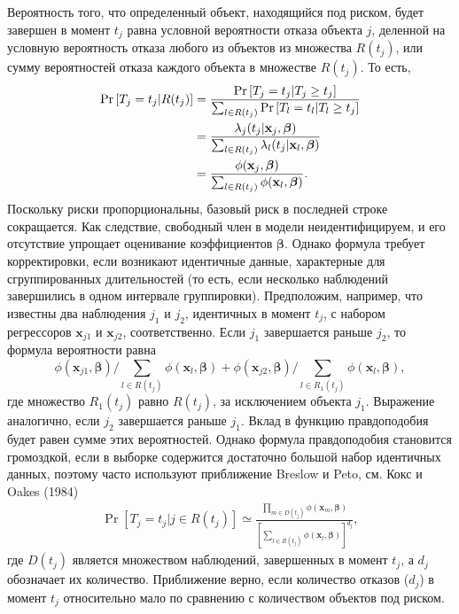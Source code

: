 Вероятность того, что определенный объект, находящийся под риском, будет завершен в момент $t_j$ равна условной вероятности отказа объекта $j$, деленной на условную вероятность отказа любого из объектов из множества $R(t_j)$, или сумму вероятностей отказа каждого объекта в множестве $R(t_j)$. То есть,
        \begin{align}
        \mathrm{Pr}\left[T_j=t_j|R(t_j)\right]&=\frac{\mathrm{Pr}\left[T_j=t_j|T_j\ge t_j\right]}{\sum_{l\in R(t_j)}\mathrm{Pr}\left[T_l=t_l|T_l\ge t_j\right]}\notag\\
        &=\frac{\lambda_j(t_j|\mathbf{x}_j,\bm{\beta})}{\sum_{l\in R(t_j)}\lambda_l(t_j|\mathbf{x}_l,\bm{\beta})}\notag\\
        &=\frac{\phi(\mathbf{x}_j,\bm{\beta})}{\sum_{l\in R(t_j)}\phi(\mathbf{x}_l,\bm{\beta})}. \notag
        \end{align}
Поскольку риски пропорциональны, базовый риск в последней строке сокращается. Как следствие, свободный член в модели неидентифицируем, и его отсутствие упрощает оценивание коэффициентов $\bm{\beta}$. Однако формула требует корректировки, если возникают идентичные данные, характерные для сгруппированных длительностей (то есть, если несколько наблюдений завершились в одном интервале группировки). Предположим, например, что известны два наблюдения $j_1$ и $j_2$, идентичных в момент $t_j$, с набором регрессоров $\mathbf{x}_{j1}$ и $\mathbf{x}_{j2}$, соответственно. Если $j_1$ завершается раньше $j_2$, то формула вероятности равна
        $$\phi(\mathbf{x}_{j1},\bm{\beta})/\sum_{l\in R(t_j)}\phi(\mathbf{x}_l,\bm{\beta})+\phi(\mathbf{x}_{j2},\bm{\beta})/\sum_{l\in R_1(t_j)}\phi(\mathbf{x}_l,\bm{\beta}),$$
где множество $R_1(t_j)$ равно $R(t_j)$, за исключением объекта $j_1$. Выражение аналогично, если $j_2$ завершается раньше $j_1$. Вклад в функцию правдоподобия будет равен сумме этих вероятностей. Однако формула правдоподобия становится громоздкой, если в выборке содержится достаточно большой набор идентичных данных, поэтому часто используют приближение Breslow и Peto, см. Кокс и Oakes (1984)
        \begin{align}
        \label{eq:17.31}
        \Pr\left[T_j=t_j|j\in R(t_j)\right]\simeq\frac{\prod_{m\in D(t_j)}\phi(\mathbf{x}_m,\bm{\beta})}{\left[\sum_{l\in R(t_j)} \phi(\mathbf{x}_l,\bm{\beta})\right]^{d_j}},
        \end{align}
где $D(t_j)$ является множеством наблюдений, завершенных в момент $t_j$, а $d_j$ обозначает их количество. Приближение верно, если количество отказов ($d_j$) в момент $t_j$ относительно мало по сравнению с количеством объектов под риском.

